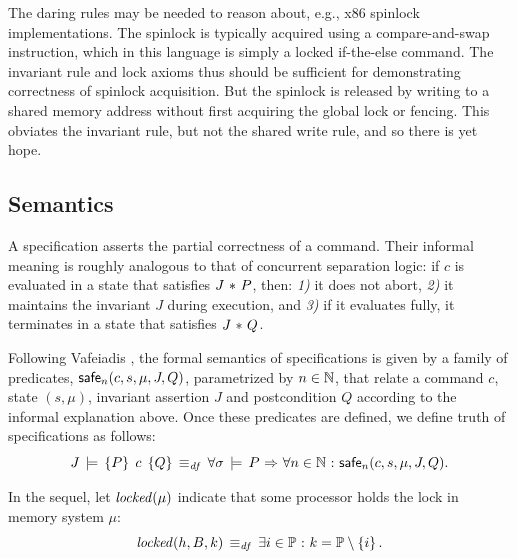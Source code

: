 \documentclass[11pt]{report}
\begin{document}
The daring rules may be needed to reason about, e.g., x86 spinlock implementations. The spinlock is typically acquired using a compare-and-swap instruction, which in this language is simply a locked if-the-else command. The invariant rule and lock axioms thus should be sufficient for demonstrating correctness of spinlock acquisition. But the spinlock is released by writing to a shared memory address without first acquiring the global lock or fencing. This obviates the invariant rule, but not the shared write rule, and so there is yet hope. 

\subsection{Semantics}
\label{sec:specification-semantics}

A specification asserts the partial correctness of a command. Their informal meaning is roughly analogous to that of concurrent separation logic: if $c$ is evaluated in a state that satisfies $J \operatorname{\,\ast\,} P$, then: \emph{1)} it does not abort, \emph{2)} it maintains the invariant $J$ during execution, and \emph{3)} if it evaluates fully, it terminates in a state that satisfies $J \operatorname{\,\ast\,} Q$. 

Following Vafeiadis \cite{V11}, the formal semantics of specifications is given by a family of predicates, $\mathsf{safe}_{n}(c,s,\mu,J,Q)$, parametrized by $n \in \mathbb{N}$, that relate a command $c$, state $(s,\mu)$, invariant assertion $J$ and postcondition $Q$ according to the informal explanation above. Once these predicates are defined, we define truth of specifications as follows: \[ J\,\models\,\left\lbrace P \right\rbrace\;c\;\left\lbrace Q \right\rbrace \operatorname{\;\equiv_{\mathit{df}}\;} \forall \sigma \,\models\, P \operatorname{\,\Rightarrow\,} \forall n \in \mathbb{N} \operatorname{\,:\,} \mathsf{safe}_{n}(c,s,\mu,J,Q).\]

In the sequel, let $\mathit{locked}(\mu)$ indicate that some processor holds the lock in memory system $\mu$: \[ \mathit{locked}(h,B,k) \operatorname{\;\equiv_{\mathit{df}}\;} \exists i \in \mathbb{P} \operatorname{\,:\,} k = \mathbb{P} \setminus \left\lbrace i \right\rbrace. \]
\end{document}
